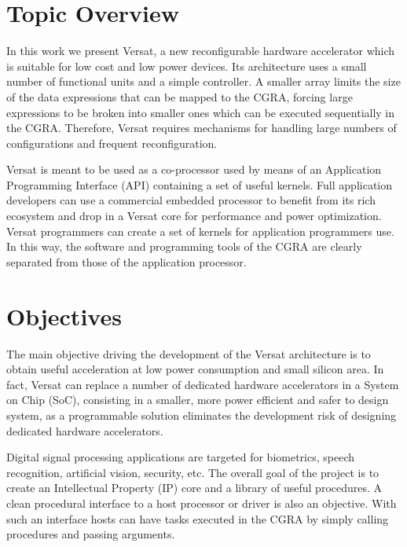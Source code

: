 \section{Topic Overview}
\label{section:overview}

In this work we present Versat, a new reconfigurable hardware
accelerator which is suitable for low cost and low power devices. Its
architecture uses a small number of functional units and a simple
controller. A smaller array limits the size of the data expressions
that can be mapped to the CGRA, forcing large expressions to be broken
into smaller ones which can be executed sequentially in the
CGRA. Therefore, Versat requires mechanisms for handling large numbers
of configurations and frequent reconfiguration.

Versat is meant to be used as a co-processor used by means of an
Application Programming Interface (API) containing a set of useful
kernels. Full application developers can use a commercial embedded
processor to benefit from its rich ecosystem and drop in a Versat core
for performance and power optimization. Versat programmers can create
a set of kernels for application programmers use. In this way, the
software and programming tools of the CGRA are clearly separated from
those of the application processor.


\section{Objectives}
\label{section:objectives}

The main objective driving the development of the Versat architecture
is to obtain useful acceleration at low power consumption and small
silicon area. In fact, Versat can replace a number of dedicated
hardware accelerators in a System on Chip (SoC), consisting in a
smaller, more power efficient and safer to design system, as a
programmable solution eliminates the development risk of designing
dedicated hardware accelerators.

Digital signal processing applications are targeted for biometrics,
speech recognition, artificial vision, security, etc. The overall goal
of the project is to create an Intellectual Property (IP) core and a
library of useful procedures. A clean procedural interface to a host
processor or driver is also an objective. With such an interface hosts
can have tasks executed in the CGRA by simply calling procedures and
passing arguments.

